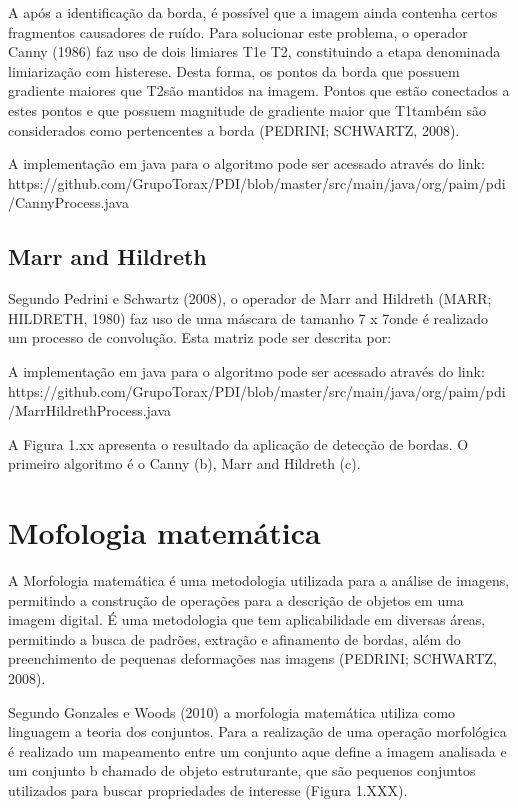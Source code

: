\documentclass[
	12pt,				%
	oneside,			%
	a4paper,			%
	english,			%
	french,				%
	spanish,			%
	brazil,				%
	]{abntex2}
\begin{document}
A após a identificação da borda, é possível que a imagem ainda contenha certos fragmentos causadores de ruído. Para solucionar este problema, o operador Canny (1986) faz uso de dois limiares T1e T2, constituindo a etapa denominada limiarização com histerese. Desta forma, os pontos da borda que possuem gradiente maiores que T2são mantidos na imagem. Pontos que estão conectados a estes pontos e que possuem magnitude de gradiente maior que T1também são considerados como pertencentes a borda (PEDRINI; SCHWARTZ, 2008).

A implementação em java para o algoritmo pode ser acessado através do link:
https://github.com/GrupoTorax/PDI/blob/master/src/main/java/org/paim/pdi/CannyProcess.java 

\subsection{Marr and Hildreth}
Segundo Pedrini e Schwartz (2008), o operador de Marr and Hildreth (MARR; HILDRETH, 1980) faz uso de uma máscara de tamanho 7 x 7onde é realizado um processo de convolução. Esta matriz pode ser descrita por:

A implementação em java para o algoritmo pode ser acessado através do link:
https://github.com/GrupoTorax/PDI/blob/master/src/main/java/org/paim/pdi/MarrHildrethProcess.java 

A Figura 1.xx apresenta o resultado da aplicação de detecção de bordas. O primeiro algoritmo é o  Canny (b), Marr and Hildreth (c).

\section{Mofologia matemática}

A Morfologia matemática é uma metodologia utilizada para a análise de imagens, permitindo a construção de operações para a descrição de objetos em uma imagem digital.  É uma metodologia que tem aplicabilidade em diversas áreas, permitindo a busca de padrões, extração e afinamento de bordas, além do preenchimento de pequenas deformações nas imagens (PEDRINI; SCHWARTZ, 2008).

Segundo Gonzales e Woods (2010) a morfologia matemática utiliza como linguagem a teoria dos conjuntos. Para a realização de uma operação morfológica é realizado um mapeamento entre um conjunto aque define a imagem analisada e um conjunto b chamado de objeto estruturante, que são pequenos conjuntos utilizados para buscar propriedades de interesse (Figura 1.XXX). 
\end{document}
